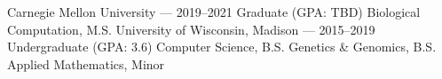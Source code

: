 \documentclass[10pt, letterpaper]{awesome-cv}
\newcommand{\col}{awesome-red}
\newcommand{\regcol}{\textcolor{\col}}
\begin{document}
\makecvheader
\vspace*{-4mm}
\begin{minipage}[t]{0.5\textwidth}
    \cvgrad
        {Carnegie Mellon University \scriptsize --- 2019--2021}
        {\regcol{Graduate (GPA: TBD)}}
        {Biological Computation, M.S.}
    \cvundergrad
        {University of Wisconsin, Madison \scriptsize --- 2015--2019}
        {\regcol{Undergraduate (GPA: 3.6)}}
        {Computer Science, B.S.}
        {Genetics \& Genomics, B.S.}
        {Applied Mathematics, Minor}
\end{minipage}
\end{document}
